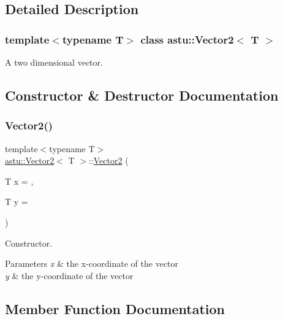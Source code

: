 \subsection{Detailed Description}
\subsubsection*{template$<$typename T$>$\newline
class astu\+::\+Vector2$<$ T $>$}

A two dimensional vector. 

\subsection{Constructor \& Destructor Documentation}
\mbox{\label{classastu_1_1Vector2_a021ec0e80fa7ca80921a17172e30fe29}} 
\subsubsection{\texorpdfstring{Vector2()}{Vector2()}}
{\footnotesize\ttfamily template$<$typename T$>$ \\
\hyperlink{classastu_1_1Vector2}{astu\+::\+Vector2}$<$ T $>$\+::\hyperlink{classastu_1_1Vector2}{Vector2} (\begin{DoxyParamCaption}\item[{T}]{x = {},  }\item[{T}]{y = {} }\end{DoxyParamCaption})\hspace{0.3cm}{\ttfamily [inline]}}

Constructor.


\begin{DoxyParams}{Parameters}
{\em x} & the x-\/coordinate of the vector \\
\hline
{\em y} & the y-\/coordinate of the vector \\
\hline
\end{DoxyParams}


\subsection{Member Function Documentation}
\mbox{\label{classastu_1_1Vector2_af44c9648648cb03637f520669e9a2d8e}} 
